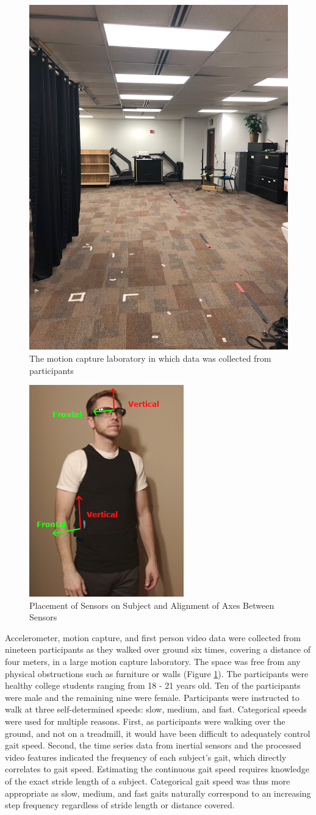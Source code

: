 \documentclass[12pt]{report}
\begin{document}
\begin{figure}[!t]
\centering
\includegraphics[width=1.8 in]{figure/MoCapRoom}
\caption{The motion capture laboratory in which data was collected from participants}
\label{fig_mocap}
\end{figure}

\begin{figure}[!t]
\centering
\includegraphics[width=1.8 in]{figure/sensorAlign}
\caption{Placement of Sensors on Subject and Alignment of Axes Between Sensors}
\label{fig_axes}
\end{figure}

Accelerometer, motion capture, and first person video data were collected from nineteen participants as they walked over ground six times, covering a distance of four meters, in a large motion capture laboratory. The space was free from any physical obstructions such as furniture or walls (Figure \ref{fig_mocap}). The participants were healthy college students ranging from 18 - 21 years old. Ten of the participants were male and the remaining nine were female. Participants were instructed to walk at three self-determined speeds: slow, medium, and fast. Categorical speeds were used for multiple reasons. First, as participants were walking over the ground, and not on a treadmill, it would have been difficult to adequately control gait speed. Second, the time series data from inertial sensors and the processed video features indicated the frequency of each subject's gait, which directly correlates to gait speed. Estimating the continuous gait speed requires knowledge of the exact stride length of a subject. Categorical gait speed was thus more appropriate as slow, medium, and fast gaits naturally correspond to an increasing step frequency regardless of stride length or distance covered.
\end{document}
